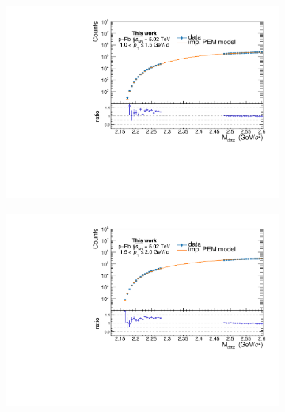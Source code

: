 \begin{appendices}
\begin{figure}[!h]
\begin{subfigure}{.5\textwidth}
  \caption{}
\end{subfigure}
\begin{subfigure}{.5\textwidth}
  \centering
  \captionsetup{justification=centering}
  \includegraphics[width=\linewidth]{gfx/appendix/impem/can_blindPEMimp2}
  \caption{}
\end{subfigure}%
\begin{subfigure}{.5\textwidth}
  \centering
  \captionsetup{justification=centering}
  \includegraphics[width=\linewidth]{gfx/appendix/impem/can_blindPEMimp3}
  \caption{}
\end{subfigure}
\begin{subfigure}{.5\textwidth}
  \centering
  \captionsetup{justification=centering}

\end{subfigure}
\end{figure}
\end{appendices}
